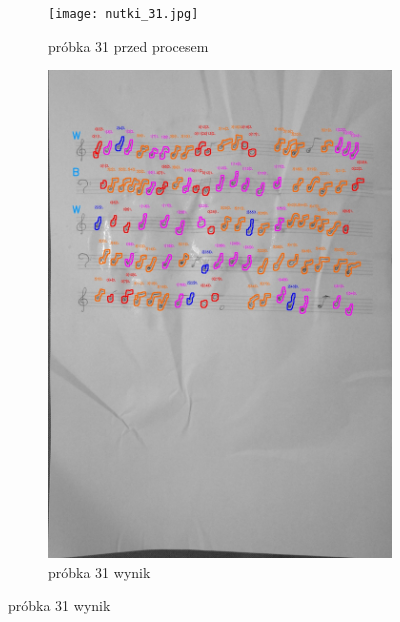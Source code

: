 \documentclass[11pt]{article}
\begin{document}
\begin{figure}
\begin{subfigure}[b]{0.475\textwidth}
        \texttt{[image: nutki\_31.jpg]}
        \caption[]%
        {{\small próbka 31 przed procesem}}
        \label{fig:sub3}
    \end{subfigure}
    \quad
    \begin{subfigure}[b]{0.475\textwidth}
        \centering
        \graphicspath{ {blobs/} }
        \includegraphics[width=\textwidth]{31_cnts.jpg}
        \caption[]%
        {{\small próbka 31 wynik}}
        \label{fig:sub 4}
    \end{subfigure}
    \label{fig 6}
\end{figure}

\FloatBarrier
\end{document}
